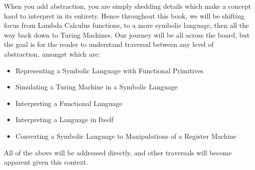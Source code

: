 When you add abstraction, you are simply shedding details which make a concept 
hard to interpret in its entirety. Hence throughout this book, we will be shifting 
focus from Lambda Calculus functions, to a more symbolic language, then all the 
way back down to Turing Machines. Our journey will be all across the board, but 
the goal is for the reader to understand traversal between any level of 
abstraction, amongst which are:

\begin{itemize}
  \item Representing a Symbolic Language with Functional Primitives
  \item Simulating a Turing Machine in a Symbolic Language
  \item Interpreting a Functional Language
  \item Interpreting a Language in Itself
  \item Converting a Symbolic Language to Manipulations of a Register Machine
\end{itemize}

All of the above will be addressed directly, and other traversals will become 
apparent given this context.

